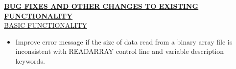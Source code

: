 	
	\item \currentmodflowversion



	\textbf{\underline{BUG FIXES AND OTHER CHANGES TO EXISTING FUNCTIONALITY}} \\
	\underline{BASIC FUNCTIONALITY}
	\begin{itemize}
		\item Improve error message if the size of data read from a binary array file is inconsistent with READARRAY control line and variable description keywords.
	\end{itemize}


